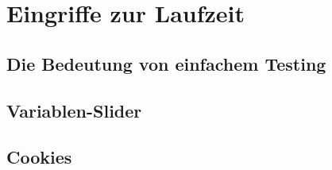 \section{Eingriffe zur Laufzeit}

\subsection{Die Bedeutung von einfachem Testing}

\subsection{Variablen-Slider}

\subsection{Cookies}
